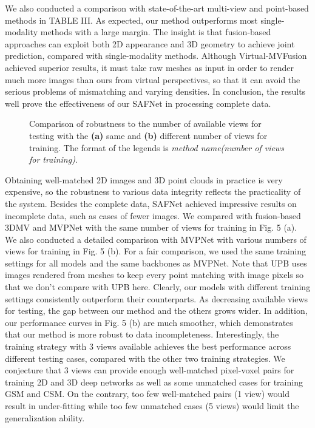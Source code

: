 \documentclass[letterpaper, 10 pt, conference]{ieeeconf}
\begin{document}
We also conducted a comparison with state-of-the-art multi-view and point-based methods in TABLE III. As expected, our method outperforms most single-modality methods with a large margin. The insight is that fusion-based approaches can exploit both 2D appearance and 3D geometry to achieve joint prediction, compared with single-modality methods.
Although Virtual-MVFusion achieved superior results, it must take raw meshes as input in order to render much more images than ours from virtual perspectives, so that it can avoid the serious problems of mismatching and varying densities. In conclusion, the results well prove the effectiveness of our SAFNet in processing complete data.



\begin{figure}[t]
\centering
{}
\vspace{-3mm}
\caption{Comparison of robustness to the number of available  views for testing with the \textbf{(a)} same and \textbf{(b)} different number of views for training.
The format of the legends is \textit{method name(number of views for training)}.} 
\vspace{-6mm}
\end{figure}


Obtaining well-matched 2D images and 3D point clouds in practice is very expensive, so the robustness to various data integrity reflects the practicality of the system. 
Besides the complete data, SAFNet achieved impressive results on incomplete data, such as cases of fewer images. 
We compared with fusion-based 3DMV\cite{dai20183dmv} and MVPNet \cite{jaritz2019multi} with the same number of views for training in Fig. 5 (a). We also conducted a detailed comparison with MVPNet with various numbers of views for training in Fig. 5 (b).
For a fair comparison, we used the same  training settings for all models and the same backbones as MVPNet. Note that UPB \cite{chiang2019unified} uses images rendered from meshes to keep every point matching with image pixels so that we don't compare with UPB here. Clearly, our models with different training settings consistently outperform their counterparts. As decreasing available views for testing, the gap between our method and the others grows wider. In addition, our performance curves in Fig. 5 (b) are much smoother, which demonstrates that our method is more robust to data incompleteness. Interestingly, the training strategy with 3 views available achieves the best performance across different testing cases, compared with the other two training strategies. We conjecture that 3 views can provide enough well-matched pixel-voxel pairs for training 2D and 3D deep networks as well as some unmatched cases for training GSM and CSM. On the contrary, too few well-matched pairs (1 view) would result in under-fitting while too few unmatched cases (5 views) would limit the generalization ability.
\end{document}
